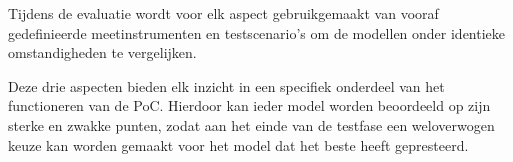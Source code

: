 
Tijdens de evaluatie wordt voor elk aspect gebruikgemaakt van vooraf gedefinieerde meetinstrumenten en testscenario’s om de modellen onder identieke omstandigheden te vergelijken.

Deze drie aspecten bieden elk inzicht in een specifiek onderdeel van het functioneren van de PoC. Hierdoor kan ieder model worden beoordeeld op zijn sterke en zwakke punten, zodat aan het einde van de testfase een weloverwogen keuze kan worden gemaakt voor het model dat het beste heeft gepresteerd.

